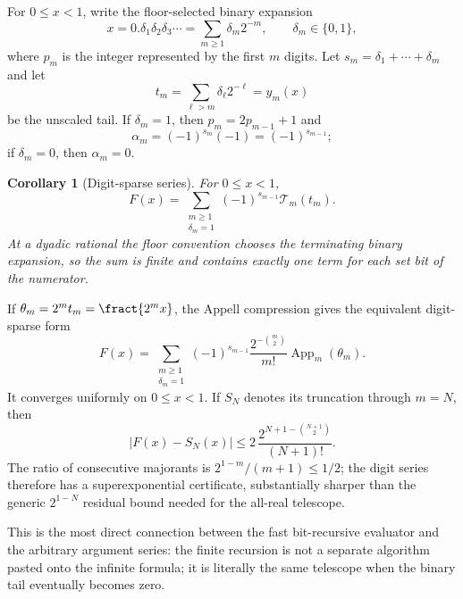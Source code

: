 \documentclass[11pt,oneside]{article}
\newtheorem{corollary}[corollary]{Corollary}
\theoremstyle{definition}
\theoremstyle{remark}
\begin{document}
For $0\le x<1$, write the floor-selected binary expansion
\begin{equation}
 x=0.\delta_1\delta_2\delta_3\cdots
 =\sum_{m\ge1}\delta_m2^{-m},
 \qquad \delta_m\in\{0,1\},                               \label{dyadicweb:eq:binary-digits}
\end{equation}
where $p_m$ is the integer represented by the first $m$ digits.  Let
\(
 s_m=\delta_1+\cdots+\delta_m
\)
and let
\begin{equation}
 t_m=\sum_{\ell>m}\delta_\ell2^{-\ell}=y_m(x)             \label{dyadicweb:eq:binary-tail-digits}
\end{equation}
be the unscaled tail.  If $\delta_m=1$, then
$p_m=2p_{m-1}+1$ and
\[
 \alpha_m=(-1)^{s_m}(-1)=(-1)^{s_{m-1}};
\]
if $\delta_m=0$, then $\alpha_m=0$.

\begin{corollary}[Digit-sparse series]
\label{dyadicweb:cor:digit-sparse}
For $0\le x<1$,
\begin{equation}
 \boxed{
 F(x)=\sum_{\substack{m\ge1\\\delta_m=1}}
 (-1)^{s_{m-1}}\mathcal T_m(t_m).}                         \label{dyadicweb:eq:digit-sparse}
\end{equation}
At a dyadic rational the floor convention chooses the terminating binary expansion, so the
sum is finite and contains exactly one term for each set bit of the numerator.
\end{corollary}

If $\theta_m=2^mt_m=\fract{2^mx}$, the Appell compression gives the equivalent
digit-sparse form
\begin{equation}
 F(x)=\sum_{\substack{m\ge1\\\delta_m=1}}
 (-1)^{s_{m-1}}
 \frac{2^{-\binom m2}}{m!}\operatorname{App}_m(\theta_m).
 \label{dyadicweb:eq:digit-Appell}
\end{equation}
It converges uniformly on $0\le x<1$.  If $S_N$ denotes its truncation through
$m=N$, then
\begin{equation}
 \boxed{
 |F(x)-S_N(x)|
 \le2\,\frac{2^{N+1-\binom{N+1}{2}}}{(N+1)!}.}
 \label{dyadicweb:eq:digit-Appell-tail}
\end{equation}
The ratio of consecutive majorants is $2^{1-m}/(m+1)\le1/2$; the digit series
therefore has a superexponential certificate, substantially sharper than the generic
$2^{1-N}$ residual bound needed for the all-real telescope.

This is the most direct connection between the fast bit-recursive evaluator and the arbitrary
argument series: the finite recursion is not a separate algorithm pasted onto the infinite
formula; it is literally the same telescope when the binary tail eventually becomes zero.
\end{document}
